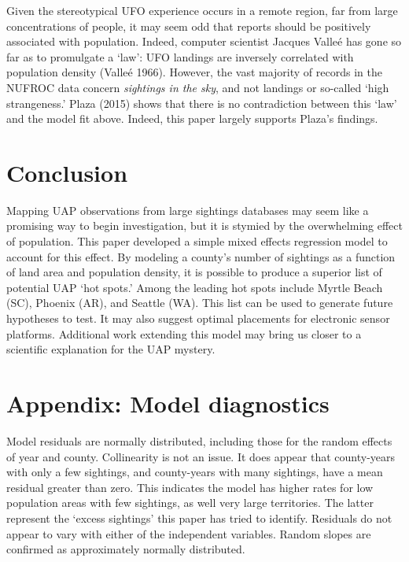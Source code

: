 \documentclass[]{elsarticle} %
\begin{document}
Given the stereotypical UFO experience occurs in a remote region, far
from large concentrations of people, it may seem odd that reports should
be positively associated with population. Indeed, computer scientist
Jacques Valleé has gone so far as to promulgate a `law': UFO landings
are inversely correlated with population density (Valleé 1966). However,
the vast majority of records in the NUFROC data concern \emph{sightings
in the sky}, and not landings or so-called `high strangeness.' Plaza
(2015) shows that there is no contradiction between this `law' and the
model fit above. Indeed, this paper largely supports Plaza's findings.

\hypertarget{conclusion}{%
\section{Conclusion}\label{conclusion}}

Mapping UAP observations from large sightings databases may seem like a
promising way to begin investigation, but it is stymied by the
overwhelming effect of population. This paper developed a simple mixed
effects regression model to account for this effect. By modeling a
county's number of sightings as a function of land area and population
density, it is possible to produce a superior list of potential UAP `hot
spots.' Among the leading hot spots include Myrtle Beach (SC), Phoenix
(AR), and Seattle (WA). This list can be used to generate future
hypotheses to test. It may also suggest optimal placements for
electronic sensor platforms. Additional work extending this model may
bring us closer to a scientific explanation for the UAP mystery.

\pagebreak

\hypertarget{appendix-model-diagnostics}{%
\section{Appendix: Model diagnostics}\label{appendix-model-diagnostics}}

Model residuals are normally distributed, including those for the random
effects of year and county. Collinearity is not an issue. It does appear
that county-years with only a few sightings, and county-years with many
sightings, have a mean residual greater than zero. This indicates the
model has higher rates for low population areas with few sightings, as
well very large territories. The latter represent the `excess sightings'
this paper has tried to identify. Residuals do not appear to vary with
either of the independent variables. Random slopes are confirmed as
approximately normally distributed.
\end{document}
